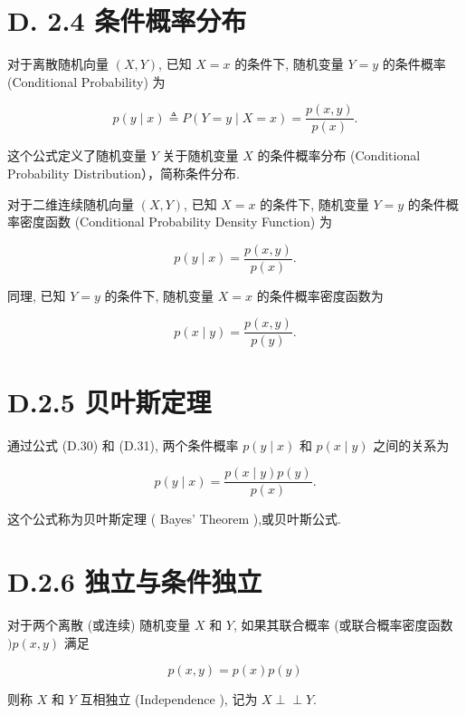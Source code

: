 \documentclass[10pt]{article}
\def\Perp{\perp\!\!\!\perp}
\begin{document}
\section*{D. 2.4 条件概率分布}
对于离散随机向量 $(X, Y)$, 已知 $X=x$ 的条件下, 随机变量 $Y=y$ 的条件概率 (Conditional Probability) 为


\begin{equation*}
p(y \mid x) \triangleq P(Y=y \mid X=x)=\frac{p(x, y)}{p(x)} . \tag{D.29}
\end{equation*}


这个公式定义了随机变量 $Y$ 关于随机变量 $X$ 的条件概率分布 (Conditional Probability Distribution），简称条件分布.

对于二维连续随机向量 $(X, Y)$, 已知 $X=x$ 的条件下, 随机变量 $Y=y$ 的条件概率密度函数 (Conditional Probability Density Function) 为


\begin{equation*}
p(y \mid x)=\frac{p(x, y)}{p(x)} . \tag{D.30}
\end{equation*}


同理, 已知 $Y=y$ 的条件下, 随机变量 $X=x$ 的条件概率密度函数为


\begin{equation*}
p(x \mid y)=\frac{p(x, y)}{p(y)} . \tag{D.31}
\end{equation*}


\section*{D.2.5 贝叶斯定理}
通过公式 (D.30) 和 (D.31), 两个条件概率 $p(y \mid x)$ 和 $p(x \mid y)$ 之间的关系为


\begin{equation*}
p(y \mid x)=\frac{p(x \mid y) p(y)}{p(x)} . \tag{D.32}
\end{equation*}


这个公式称为贝叶斯定理 ( Bayes' Theorem ),或贝叶斯公式.

\section*{D.2.6 独立与条件独立}
对于两个离散 (或连续) 随机变量 $X$ 和 $Y$, 如果其联合概率 (或联合概率密度函数 $) p(x, y)$ 满足


\begin{equation*}
p(x, y)=p(x) p(y) \tag{D.33}
\end{equation*}


则称 $X$ 和 $Y$ 互相独立 (Independence ), 记为 $X \Perp Y$.
\end{document}
